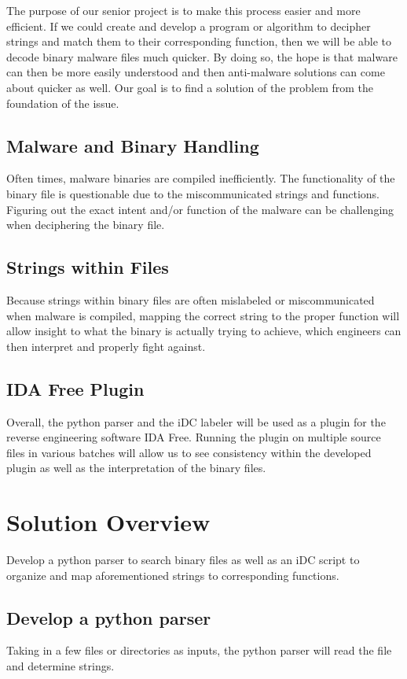 \documentclass[journal,12pt,onecolumn,draftclsnofoot,]{IEEEtran}
\begin{document}
The purpose of our senior project is to make this process easier and more efficient. If we could create and develop a program or algorithm to decipher strings and match them to their corresponding function, then we will be able to decode binary malware files much quicker. By doing so, the hope is that malware can then be more easily understood and then anti-malware solutions can come about quicker as well. Our goal is to find a solution of the problem from the foundation of the issue.

\subsection{Malware and Binary Handling}
Often times, malware binaries are compiled inefficiently. The functionality of the binary file is questionable due to the miscommunicated strings and functions. Figuring out the exact intent and/or function of the malware can be challenging when deciphering the binary file.

\subsection{Strings within Files}

Because strings within binary files are often mislabeled or miscommunicated when malware is compiled, mapping the correct string to the proper function will allow insight to what the binary is actually trying to achieve, which engineers can then interpret and properly fight against.

\subsection{IDA Free Plugin}
Overall, the python parser and the iDC labeler will be used as a plugin for the reverse engineering software IDA Free. Running the plugin on multiple source files in various batches will allow us to see consistency within the developed plugin as well as the interpretation of the binary files.


\section{Solution Overview}

Develop a python parser to search binary files as well as an iDC script to organize and map aforementioned strings to corresponding functions.

\subsection{Develop a python parser}
Taking in a few files or directories as inputs, the python parser will read the file and determine strings.
\end{document}
